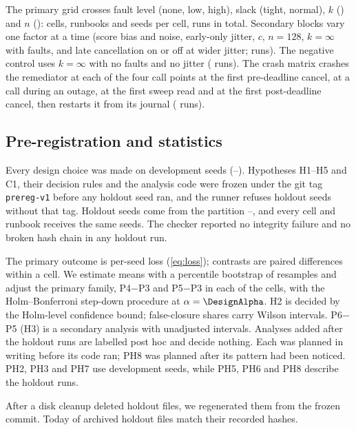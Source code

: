 The primary grid crosses fault level (none, low, high), slack (tight, normal), $k$ () and $n$ (): \DesignCells{} cells, \DesignPolicies{} runbooks and \NSeedsPrimary{} seeds per cell, \NRunsPrimary{} runs in total. Secondary blocks vary one factor at a time (score bias and noise, early-only jitter, $c$, $n = 128$, $k = \infty$ with faults, and late cancellation on or off at wider jitter; \NRunsSecondary{} runs). The negative control uses $k = \infty$ with no faults and no jitter (\NRunsNegativeControl{} runs). The crash matrix crashes the remediator at each of the four call points at the first pre-deadline cancel, at a call during an outage, at the first sweep read and at the first post-deadline cancel, then restarts it from its journal (\NRunsCrashMatrix{} runs).

\subsection{Pre-registration and statistics}
Every design choice was made on development seeds (\DesignDevFirst--\DesignDevLast). Hypotheses H1--H5 and C1, their decision rules and the analysis code were frozen under the git tag \texttt{prereg-v1} before any holdout seed ran, and the runner refuses holdout seeds without that tag. Holdout seeds come from the partition \DesignHoldoutFirst--\DesignHoldoutLast, and every cell and runbook receives the same \NSeedsPrimary{} seeds. The checker reported no integrity failure and no broken hash chain in any holdout run.

The primary outcome is per-seed loss (\ref{eq:loss}); contrasts are paired differences within a cell. We estimate means with a percentile bootstrap of \DesignBoot{} resamples and adjust the primary family, P4$-$P3 and P5$-$P3 in each of the \DesignCells{} cells, with the Holm--Bonferroni step-down procedure at $\alpha = \DesignAlpha$. H2 is decided by the Holm-level confidence bound; false-closure shares carry Wilson intervals. P6$-$P5 (H3) is a secondary analysis with unadjusted intervals. Analyses added after the holdout runs are labelled post hoc and decide nothing. Each was planned in writing before its code ran; PH8 was planned after its pattern had been noticed. PH2, PH3 and PH7 use development seeds, while PH5, PH6 and PH8 describe the holdout runs.

After a disk cleanup deleted holdout files, we regenerated them from the frozen commit. Today \ReproHoldoutFilesMatched{} of \ReproHoldoutFilesListed{} archived holdout files match their recorded  hashes.
